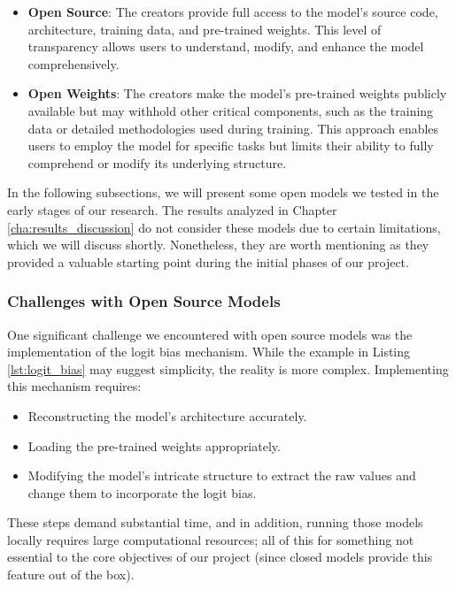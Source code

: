 \begin{itemize}
  \item \textbf{Open Source}: The creators provide full access to the model's source
    code, architecture, training data, and pre-trained weights. This level of transparency
    allows users to understand, modify, and enhance the model comprehensively.

  \item \textbf{Open Weights}: The creators make the model's pre-trained weights
    publicly available but may withhold other critical components, such as the
    training data or detailed methodologies used during training. This approach enables
    users to employ the model for specific tasks but limits their ability to fully
    comprehend or modify its underlying structure.
\end{itemize}

In the following subsections, we will present some open models we tested in the
early stages of our research. The results analyzed in Chapter \ref{cha:results_discussion}
do not consider these models due to certain limitations, which we will discuss
shortly. Nonetheless, they are worth mentioning as they provided a valuable
starting point during the initial phases of our project.

\subsubsection{Challenges with Open Source Models}

One significant challenge we encountered with open source models was the implementation
of the logit bias mechanism. While the example in Listing \ref{lst:logit_bias}
may suggest simplicity, the reality is more complex. Implementing this mechanism
requires:

\begin{itemize}
  \item Reconstructing the model's architecture accurately.

  \item Loading the pre-trained weights appropriately.

  \item Modifying the model's intricate structure to extract the raw values and change
    them to incorporate the logit bias.
\end{itemize}

These steps demand substantial time, and in addition, running those models locally
requires large computational resources; all of this for something not essential
to the core objectives of our project (since closed models provide this feature out
of the box).

